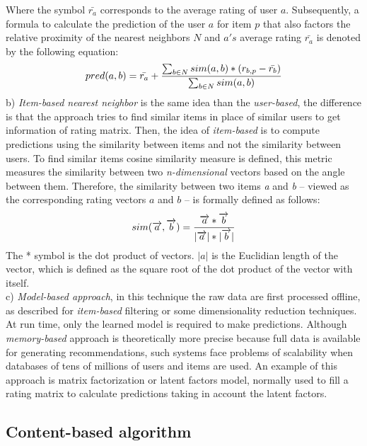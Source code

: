 Where the symbol $\bar{r_a}$ corresponds to the average rating of user
$a$. Subsequently, a formula to calculate the prediction of the user
$a$ for item $p$ that also factors the relative proximity of the
nearest neighbors $N$ and $a's$ average rating $\bar{r_a}$ is denoted
by the following equation:
\begin{equation}\label{eq:prediction}
\displaystyle pred(a,b) = \bar{r_a} + 
{\sum_{b \in N} sim(a,b) * (r_{b,p}- \bar{r_b}) 
\over \sum_{b \in N} sim(a,b)} 
\end{equation}
b) \textit{Item-based nearest neighbor} is the same idea than the \textit
{user-based}, the difference is that the approach tries to find
similar items in place of similar users to get information of rating
matrix.  Then, the idea of \textit{item-based} is to compute
predictions using the similarity between items and not the similarity
between users.  To find similar items cosine similarity measure is
defined, this metric measures the similarity between two
\textit{n-dimensional} vectors based on the angle between them.
Therefore, the similarity between two items \textit{a} and \textit{b}
– viewed as the corresponding rating vectors $a$ and $b$ – is formally
defined as follows:
\begin{equation}\label{eq:cosine}
\displaystyle sim(\overrightarrow{a},\overrightarrow{b})= 
{\overrightarrow{a}* \overrightarrow{b} \over
|\overrightarrow{a}|*|\overrightarrow{b}| }
\end{equation}
The * symbol is the dot product of vectors. $|a|$ is the Euclidian
length of the vector, which is defined as the square root of the dot
product of the vector with itself.\\ 
c) \textit{Model-based approach}, in this technique  the raw data are
first processed offline, as described for \textit {item-based}
filtering or some dimensionality reduction techniques. At run time,
only the learned model is required to make predictions. Although
\textit{memory-based} approach is theoretically more precise because
full data is available for generating recommendations, such systems
face problems of scalability when databases of tens of millions of
users and items are used. An example of this approach is matrix
factorization or latent factors model, normally used to fill a rating
matrix to calculate predictions taking in account the latent factors.

\subsection{Content-based algorithm}

